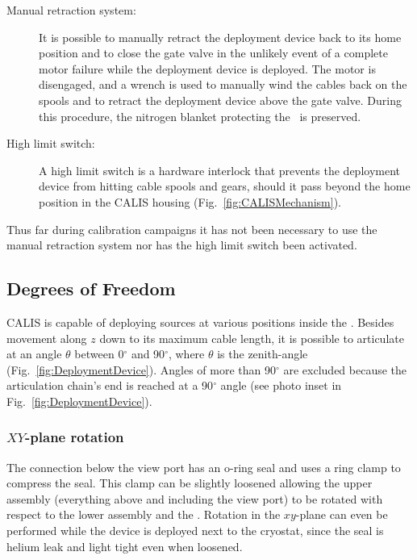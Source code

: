 \begin{description}
\item[Manual retraction system:]
It is possible to manually retract the deployment device back to its home position and to close the gate valve in the unlikely event of a complete motor failure while the deployment device is deployed. The motor is disengaged, and a wrench is used to manually wind the cables back on the spools and to retract the deployment device above the gate valve. During this procedure, the nitrogen blanket protecting the \lsv\ is preserved. 
   
\item[High limit switch:]
A high limit switch is a hardware interlock that prevents the deployment device from hitting cable spools and gears, should it pass beyond the home position in the CALIS housing (Fig.~\ref{fig:CALISMechanism}). 
\end{description}

Thus far during calibration campaigns it has not been necessary to use the manual retraction system nor has the high limit switch been activated.
	

\subsection{Degrees of Freedom}

CALIS is capable of deploying sources at various positions inside the \lsv. Besides movement along $z$ down to its maximum cable length, it is possible to articulate at an angle $\theta$ between 0$^{\circ}$ and 90$^{\circ}$, where $\theta$ is the zenith-angle (Fig.~\ref{fig:DeploymentDevice}). Angles of more than 90$^{\circ}$ are excluded because the articulation chain's end is reached at a 90$^{\circ}$ angle (see photo inset in Fig.~\ref{fig:DeploymentDevice}).

\subsubsection*{$XY$-plane rotation}\label{sec:XYrotation}
The connection below the view port has an o-ring seal and uses a ring clamp to compress the seal. This clamp can be slightly loosened allowing the upper assembly (everything above and including the view port) to be rotated with respect to the lower assembly and the \tpc. Rotation in the $xy$-plane can even be performed while the device is deployed next to the cryostat, since the seal is helium leak and light tight even when loosened.

